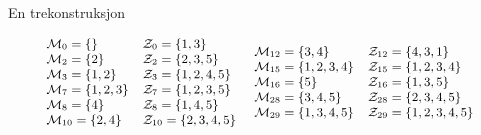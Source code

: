 \documentclass{beamer}
\begin{document}
\begin{frame}{En trekonstruksjon}
\begin{center}

\[
\small
    \begin{array}{ll}
        \mathcal{M}_0    = \left\{{}\right\}           & \mathcal{Z}_0    = \left\{{1,3}\right\} \\
        \mathcal{M}_2    = \left\{{2}\right\}          & \mathcal{Z}_2    = \left\{{2,3,5}\right\} \\
        \mathcal{M}_3    = \left\{{1,2}\right\}        & \mathcal{Z}_3    = \left\{{1,2,4,5}\right\} \\
        \mathcal{M}_7    = \left\{{1,2,3}\right\}      & \mathcal{Z}_7    = \left\{{1,2,3,5}\right\} \\
        \mathcal{M}_8    = \left\{{4}\right\}          & \mathcal{Z}_8    = \left\{{1,4,5}\right\} \\
        \mathcal{M}_{10} = \left\{{2,4}\right\}        & \mathcal{Z}_{10} = \left\{{2,3,4,5}\right\}
    \end{array}
~
    \begin{array}{ll}
        \mathcal{M}_{12} = \left\{{3,4}\right\}        & \mathcal{Z}_{12} = \left\{{4,3,1}\right\} \\
        \mathcal{M}_{15} = \left\{{1,2,3,4}\right\}    & \mathcal{Z}_{15} = \left\{{1,2,3,4}\right\} \\
        \mathcal{M}_{16} = \left\{{5}\right\}          & \mathcal{Z}_{16} = \left\{{1,3,5}\right\} \\
        \mathcal{M}_{28} = \left\{{3,4,5}\right\}      & \mathcal{Z}_{28} = \left\{{2,3,4,5}\right\} \\
        \mathcal{M}_{29} = \left\{{1,3,4,5}\right\}    & \mathcal{Z}_{29} = \left\{{1,2,3,4,5}\right\}
    \end{array}
\]
\end{center}
\end{frame}
\end{document}
